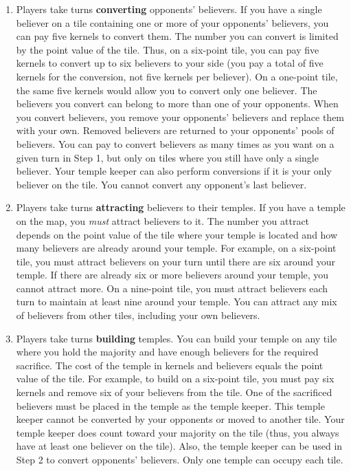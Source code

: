 \begin{enumerate}

\item Players take turns {\bf converting} opponents' believers.
If you have a single believer on a tile containing one or more of your opponents' believers, you can pay five kernels to convert them.
The number you can convert is limited by the point value of the tile.
Thus, on a six-point tile, you can pay five kernels to convert up to six believers to your side (you pay a total of five kernels for the conversion, not five kernels per believer).
On a one-point tile, the same five kernels would allow you to convert only one believer.
The believers you convert can belong to more than one of your opponents.  
When you convert believers, you remove your opponents' believers and replace them with your own.
Removed believers are returned to your opponents' pools of believers.
You can pay to convert believers as many times as you want on a given turn in Step 1, but only on tiles where you still have only a single believer.
Your temple keeper can also perform conversions if it is your only believer on the tile.
You cannot convert any opponent's last believer.

\item Players take turns {\bf attracting} believers to their temples.
If you have a temple on the map, you {\em must} attract believers to it.
The number you attract depends on the point value of the tile where your temple is located and how many believers are already around your temple.
For example, on a six-point tile, you must attract believers on your turn until there are six around your temple.
If there are already six or more believers around your temple, you cannot attract more.
On a nine-point tile, you must attract believers each turn to maintain at least nine around your temple.
You can attract any mix of believers from other tiles, including your own believers.

\item Players take turns {\bf building} temples.
You can build your temple on any tile where you hold the majority and have enough believers for the required sacrifice.
The cost of the temple in kernels and believers equals the point value of the tile.
For example, to build on a six-point tile, you must pay six kernels and remove six of your believers from the tile.
One of the sacrificed believers must be placed in the temple as the temple keeper.
This temple keeper cannot be converted by your opponents or moved to another tile.
Your temple keeper does count toward your majority on the tile (thus, you always have at least one believer on the tile).
Also, the temple keeper can be used in Step 2 to convert opponents' believers. 
Only one temple can occupy each tile.


\end{enumerate}
